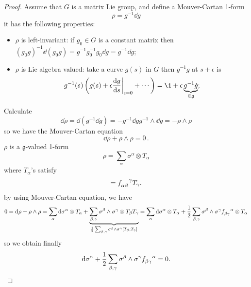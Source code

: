 \documentclass[a4paper,11pt]{article}
\begin{document}
    \begin{proof}
    Assume that $G$ is a matrix Lie group, and define a Mouver-Cartan 1-form 
    \begin{equation}
        \rho = g^{-1} \dd{g}
    \end{equation}
    it has the following properties: 
    \begin{itemize}
        \item $\rho$ is left-invariant: if $g_0 \in G$ is a constant matrix then $(g_0 g)^{-1} \dd{(g_0 g)} = g^{-1} g_0^{-1} g_0 \dd{g} = g^{-1} \dd{g}$;
        \item $\rho$ is Lie algebra valued: take a curve $g(s)$ in $G$ then $g^{-1} g$ at $s+\epsilon$ is \begin{equation}
            g^{-1}(s) \left( g(s) + \epsilon \dv{g}{s}\bigg|_{\epsilon = 0} + \cdots \right) = \1 + \epsilon \underbrace{g^{-1} \dot g}_{\in \mathfrak{g}};
        \end{equation}
        \end{itemize}

        Calculate 
        \begin{equation}
            \dd{\rho} = \dd{(g^{-1} \dd{g})} = - g^{-1} \dd{g} g^{-1} \wedge \dd{g} = - \rho \wedge \rho
        \end{equation}
        so we have the Mouver-Cartan equation 
        \begin{equation}
            \boxed{\dd{\rho} + \rho \wedge \rho = 0}\,.
        \end{equation}
        $\rho$ is a $\mathfrak{g}$-valued 1-form
        \begin{equation}
            \rho = \sum_\alpha \sigma^\alpha \otimes T_\alpha
        \end{equation}
        where $T_\alpha$'s satisfy
        \begin{equation}
            [T_\alpha, T_\beta] = f\indices{_{\alpha \beta}^\gamma} T_\gamma.
        \end{equation}
        by using Mouver-Cartan equation, we have 
        \begin{equation}
            0 = \dd{\rho} + \rho \wedge \rho = \sum_\alpha \dd{\sigma^\alpha} \otimes T_\alpha + \underbrace{\sum_{\beta,\gamma} \sigma^\beta \wedge \sigma^\gamma \otimes T_{\beta} T_{\gamma}}_{\frac{1}{2} \sum_{\beta,\gamma} \sigma^\beta \wedge \sigma^\gamma [T_\beta, T_\gamma]} = \sum_\alpha \dd{\sigma^\alpha} \otimes T_\alpha + \frac{1}{2} \sum_{\beta,\gamma} \sigma^\beta \wedge \sigma^\gamma f\indices{_{\beta \gamma}^\alpha} \otimes T_\alpha 
        \end{equation}
        so we obtain finally
        \begin{equation}
            \dd{\sigma^\alpha} + \frac{1}{2} \sum_{\beta,\gamma} \sigma^\beta \wedge \sigma^\gamma f\indices{_{\beta \gamma}^\alpha} = 0.
        \end{equation}
    \end{proof}
\end{document}
